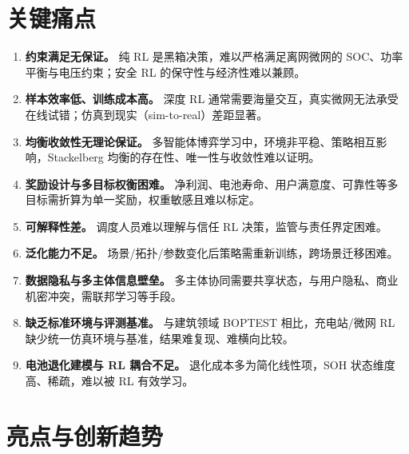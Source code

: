 \documentclass[UTF8,a4paper,11pt]{ctexart}
\begin{document}
\section{关键痛点}

\begin{enumerate}
  \item \textbf{约束满足无保证。} 纯 RL 是黑箱决策，难以严格满足离网微网的 SOC、功率平衡与电压约束；安全 RL 的保守性与经济性难以兼顾\cite{ref8,ref9}。
  \item \textbf{样本效率低、训练成本高。} 深度 RL 通常需要海量交互，真实微网无法承受在线试错；仿真到现实（sim-to-real）差距显著。
  \item \textbf{均衡收敛性无理论保证。} 多智能体博弈学习中，环境非平稳、策略相互影响，Stackelberg 均衡的存在性、唯一性与收敛性难以证明\cite{ref6}。
  \item \textbf{奖励设计与多目标权衡困难。} 净利润、电池寿命、用户满意度、可靠性等多目标需折算为单一奖励，权重敏感且难以标定。
  \item \textbf{可解释性差。} 调度人员难以理解与信任 RL 决策，监管与责任界定困难。
  \item \textbf{泛化能力不足。} 场景/拓扑/参数变化后策略需重新训练，跨场景迁移困难。
  \item \textbf{数据隐私与多主体信息壁垒。} 多主体协同需要共享状态，与用户隐私、商业机密冲突，需联邦学习等手段\cite{ref12,ref18}。
  \item \textbf{缺乏标准环境与评测基准。} 与建筑领域 BOPTEST 相比，充电站/微网 RL 缺少统一仿真环境与基准，结果难复现、难横向比较\cite{ref7}。
  \item \textbf{电池退化建模与 RL 耦合不足。} 退化成本多为简化线性项，SOH 状态维度高、稀疏，难以被 RL 有效学习。
\end{enumerate}

\section{亮点与创新趋势}
\end{document}
